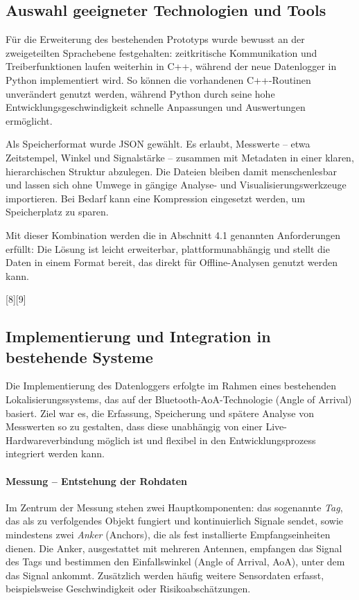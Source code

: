 \documentclass[a4paper, 12pt]{article} %
\begin{document}
\subsection{Auswahl geeigneter Technologien und Tools}
Für die Erweiterung des bestehenden Prototyps wurde bewusst an der zweigeteilten Sprachebene festgehalten: 
zeitkritische Kommunikation und Treiberfunktionen laufen weiterhin in C++, während der neue Datenlogger in Python 
implementiert wird. So können die vorhandenen C++-Routinen unverändert genutzt werden, während Python durch seine hohe 
Entwicklungsgeschwindigkeit schnelle Anpassungen und Auswertungen ermöglicht.

Als Speicherformat wurde JSON gewählt. Es erlaubt, Messwerte – etwa Zeitstempel, Winkel und 
Signalstärke – zusammen mit Metadaten in einer klaren, hierarchischen Struktur abzulegen. Die Dateien bleiben damit menschenlesbar 
und lassen sich ohne Umwege in gängige Analyse- und Visualisierungswerkzeuge importieren. Bei Bedarf kann eine Kompression eingesetzt werden, 
um Speicherplatz zu sparen.

Mit dieser Kombination werden die in Abschnitt 4.1 genannten Anforderungen erfüllt: Die Lösung ist leicht erweiterbar, 
plattform­unabhängig und stellt die Daten in einem Format bereit, das direkt für Offline-Analysen genutzt werden kann.

[8][9]

\subsection{Implementierung und Integration in bestehende Systeme}

Die Implementierung des Datenloggers erfolgte im Rahmen eines bestehenden Lokalisierungssystems, das auf der Bluetooth-AoA-Technologie 
(Angle of Arrival) basiert. Ziel war es, die Erfassung, Speicherung und spätere Analyse von Messwerten so zu gestalten, dass diese unabhängig
von einer Live-Hardwareverbindung möglich ist und flexibel in den Entwicklungsprozess integriert werden kann.

\paragraph{Messung – Entstehung der Rohdaten}

Im Zentrum der Messung stehen zwei Hauptkomponenten: das sogenannte \textit{Tag}, das als zu verfolgendes Objekt fungiert 
und kontinuierlich Signale sendet, sowie mindestens zwei \textit{Anker} (Anchors), die als fest installierte Empfangseinheiten dienen. 
Die Anker, ausgestattet mit mehreren Antennen, empfangen das Signal des Tags und bestimmen den Einfallswinkel (Angle of Arrival, AoA), unter dem 
das Signal ankommt. Zusätzlich werden häufig weitere Sensordaten erfasst, beispielsweise Geschwindigkeit oder Risikoabschätzungen.
\end{document}
